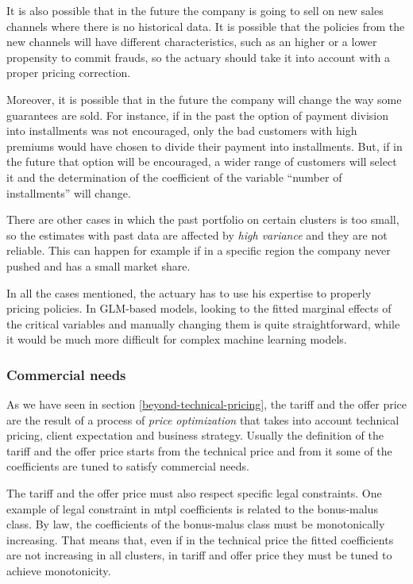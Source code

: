 \documentclass[a4paper, twoside, openright, 12pt]{report}
\theoremstyle{definition}
\theoremstyle{definition}
\theoremstyle{definition}
\theoremstyle{remark}
\begin{document}
It is also possible that in the future the company is going to sell on new sales channels where there is no historical data. It is possible that the policies from the new channels will have different characteristics, such as an higher or a lower propensity to commit frauds, so the actuary should take it into account with a proper pricing correction.

Moreover, it is possible that in the future the company will change the way some guarantees are sold. For instance, if in the past the option of payment division into installments was not encouraged, only the bad customers with high premiums would have chosen to divide their payment into installments. But, if in the future that option will be encouraged, a wider range of customers will select it and the determination of the coefficient of the variable ``number of installments'' will change.

There are other cases in which the past portfolio on certain clusters is too small, so the estimates with past data are affected by \emph{high variance} and they are not reliable. This can happen for example if in a specific region the company never pushed and has a small market share.

In all the cases mentioned, the actuary has to use his expertise to properly pricing policies. In GLM-based models, looking to the fitted marginal effects of the critical variables and manually changing them is quite straightforward, while it would be much more difficult for complex machine learning models.

\hypertarget{commercial-needs}{%
\subsubsection{Commercial needs}\label{commercial-needs}}

As we have seen in section \ref{beyond-technical-pricing}, the tariff and the offer price are the result of a process of \emph{price optimization} that takes into account technical pricing, client expectation and business strategy. Usually the definition of the tariff and the offer price starts from the technical price and from it some of the coefficients are tuned to satisfy commercial needs.

The tariff and the offer price must also respect specific legal constraints. One example of legal constraint in \ac{mtpl} coefficients is related to the bonus-malus class. By law, the coefficients of the bonus-malus class must be monotonically increasing. That means that, even if in the technical price the fitted coefficients are not increasing in all clusters, in tariff and offer price they must be tuned to achieve monotonicity.
\end{document}
